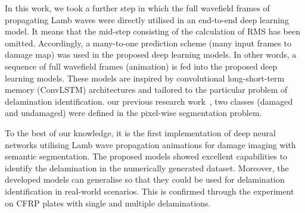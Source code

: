 \begin{sloppypar}
	In this work, we took a further step in which the full wavefield frames of propagating Lamb waves were directly utilised in an end-to-end
	deep learning model.
	It means that the mid-step consisting of the calculation of RMS has been omitted.
	Accordingly, a many-to-one prediction scheme (many input frames to damage map) was used in the proposed deep learning models.
	In other words, a sequence of full wavefield frames (animation) is fed into the proposed deep learning models.
	These models are inspired by convolutional long-short-term memory (ConvLSTM) architectures and tailored to the particular problem of delamination identification.
	\DIFdelbegin {}\DIFdelend \DIFaddbegin {}\DIFaddend our previous research work~\cite{Ijjeh2021, Ijjeh2022}, two 
	classes (damaged and undamaged) were defined in the pixel-wise segmentation 
	problem.

	To the best of our knowledge, it is the first implementation of deep neural networks utilising Lamb wave propagation animations for damage imaging with semantic segmentation. 
	The proposed models showed excellent capabilities to identify the delamination in the numerically generated dataset.
	Moreover, the developed models can generalise so that they could be used for delamination identification in real-world scenarios.
	This is confirmed through the experiment on CFRP plates with single and multiple delaminations.
\end{sloppypar}


